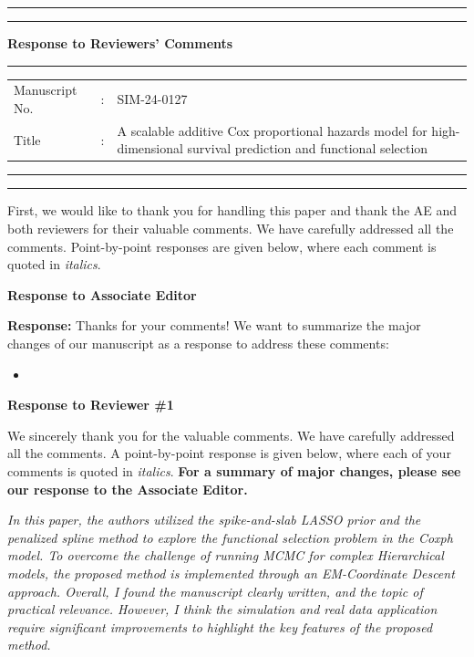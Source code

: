 \documentclass[11pt]{article}
\newcommand{\fixme}[1]{\textcolor{red}{\bf #1}}
\begin{document}
\hrule
\vspace*{0.02cm}
\hrule
\vspace*{1cm}
{\Large \bf Response to Reviewers' Comments}
\vspace*{1cm}
\hrule
\vspace*{0.5cm}
\begin{tabular}{llp{11.5cm}}
Manuscript No. & : & SIM-24-0127 \\
Title & : & A scalable additive Cox proportional hazards model for high-dimensional survival prediction and functional selection\\
\end{tabular}
\vspace*{0.5cm}
\hrule
\vspace*{0.02cm}
\hrule

\vspace*{1cm}

First, we would like to thank you for handling this paper and thank the AE and both reviewers for their valuable comments. We have carefully addressed all the comments. Point-by-point responses are given below, where each comment is quoted in {\em italics}.

\bigskip

{\bf Response to Associate Editor}

{\bf Response:} Thanks for your comments! We want to summarize the major changes of our manuscript as a response to address these comments:

\begin{itemize}
    \item \fixme{}
\end{itemize}

\medskip

\newpage
{\bf Response to Reviewer \#1}

We sincerely thank you for the valuable comments. We have carefully addressed all the comments. A point-by-point response is given below, where each of your comments is quoted in {\em italics}. \textbf{For a summary of major changes, please see our response to the Associate Editor. }

\bigskip

{\em In this paper, the authors utilized the spike-and-slab LASSO prior and the penalized spline method to explore the functional selection problem in the Coxph model. To overcome the challenge of running MCMC for complex Hierarchical models, the proposed method is implemented through an EM-Coordinate Descent approach. Overall, I found the manuscript clearly written, and the topic of practical relevance. However, I think the simulation and real data application require significant improvements to highlight the key features of the proposed method.
}
\end{document}
